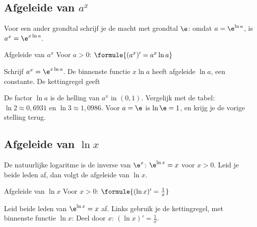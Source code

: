 \subsection{Afgeleide van \texorpdfstring{$a^x$}{a tot de x}}

Voor een ander grondtal schrijf je de macht met grondtal $\e$: omdat $a = \e^{\ln a}$, is $a^x = \e^{x \ln a}$.

\begin{theorie}
\begin{stelling}{Afgeleide van \texorpdfstring{$a^x$}{a tot de x}}
Voor $a > 0$: \quad $\formule{(a^x)' = a^x \ln a}$
\end{stelling}
\begin{bewijs}
Schrijf $a^x = \e^{x \ln a}$. De binnenste functie $x \ln a$ heeft afgeleide $\ln a$, een constante. De kettingregel geeft
\end{bewijs}
\end{theorie}

De factor $\ln a$ is de helling van $a^x$ in $(0, 1)$. Vergelijk met de tabel: $\ln 2 \approx 0{,}6931$ en $\ln 3 \approx 1{,}0986$. Voor $a = \e$ is $\ln \e = 1$, en krijg je de vorige stelling terug.


\begin{oefeningen}
\end{oefeningen}

\subsection{Afgeleide van \texorpdfstring{$\ln x$}{ln x}}

De natuurlijke logaritme is de inverse van $\e^x$: $\e^{\ln x} = x$ voor $x > 0$. Leid je beide leden af, dan volgt de afgeleide van $\ln x$.

\begin{theorie}
\begin{stelling}{Afgeleide van \texorpdfstring{$\ln x$}{ln x}}
Voor $x > 0$: \quad $\formule{(\ln x)' = \frac{1}{x}}$
\end{stelling}
\begin{bewijs}
Leid beide leden van $\e^{\ln x} = x$ af. Links gebruik je de kettingregel, met binnenste functie $\ln x$:
Deel door $x$: $(\ln x)' = \frac1x$.
\end{bewijs}
\end{theorie}

